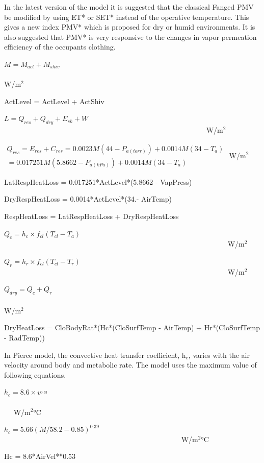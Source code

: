 In the latest version of the model it is suggested that the classical Fanged PMV be modified by using ET* or SET* instead of the operative temperature. This gives a new index PMV* which is proposed for dry or humid environments. It is also suggested that PMV* is very responsive to the changes in vapor permeation efficiency of the occupants clothing.

\(M = {M_{act}} + {M_{shiv}}\) ~~~~~~~~~~~~~~~~~~~~~~~~~~~~~~~~~~~~~~~~~~~~~~~~~~~~~~~~~~~~~~~~~~~~ W/m\(^{2}\)

ActLevel = ActLevel + ActShiv

\(L = {Q_{res}} + {Q_{dry}} + {E_{sk}} + W\) ~~~~~~~~~~~~~~~~~~~~~~~~~~~~~~~~~~~~~~~~~~~~~~~~~~~~~~~~ W/m\(^{2}\)

\(\begin{array}{l}{Q_{res}} = {E_{res}} + {C_{res}} = 0.0023M(44 - {P_{a(torr)}}) + 0.0014M(34 - {T_a})\\ = 0.017251M(5.8662 - {P_{a(kPa)}}) + 0.0014M(34 - {T_a})\end{array}\) W/m\(^{2}\)

LatRespHeatLoss = 0.017251*ActLevel*(5.8662 - VapPress)

DryRespHeatLoss = 0.0014*ActLevel*(34.- AirTemp)

RespHeatLoss = LatRespHeatLoss + DryRespHeatLoss

\({Q_c} = {h_c} \times {f_{cl}}({T_{cl}} - {T_a})\) ~~~~~~~~~~~~~~~~~~~~~~~~~~~~~~~~~~~~~~~~~~~~~~~~~~~~~~~~~~~~~~ W/m\(^{2}\)

\({Q_r} = {h_r} \times {f_{cl}}({T_{cl}} - {T_r})\) ~~~~~~~~~~~~~~~~~~~~~~~~~~~~~~~~~~~~~~~~~~~~~~~~~~~~~~~~~~~~~~ W/m\(^{2}\)

\({Q_{dry}} = {Q_c} + {Q_r}\) ~~~~~~~~~~~~~~~~~~~~~~~~~~~~~~~~~~~~~~~~~~~~~~~~~~~~~~~~~~~~~~~~~~~~~~~~ W/m\(^{2}\)

DryHeatLoss = CloBodyRat*(Hc*(CloSurfTemp - AirTemp) + Hr*(CloSurfTemp - RadTemp))

In Pierce model, the convective heat transfer coefficient, h\(_{c}\), varies with the air velocity around body and metabolic rate. The model uses the maximum value of following equations.

\({h_c} = 8.6 \times {v^{_{0.53}}}\) ~~~~~~~~~~~~~~~~~~~~~~~~~~~~~~~~~~~~~~~~~~~~~~~~~~~~~~~~~~~~~~~~~~~~~~~~~~ W/m\(^{2}\)°C

\({h_c} = 5.66{(M/58.2 - 0.85)^{0.39}}\) ~~~~~~~~~~~~~~~~~~~~~~~~~~~~~~~~~~~~~~~~~~~~~~~~~ W/m\(^{2}\)°C

Hc = 8.6*AirVel**0.53

